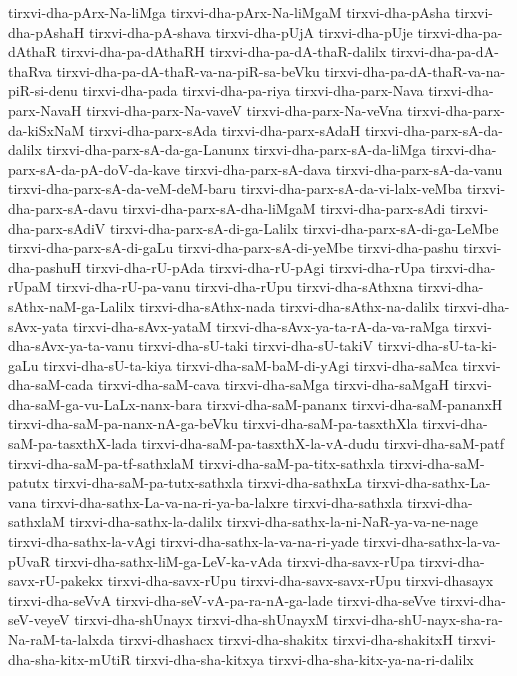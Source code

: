 {tirxvi-dha-pArx-Na-liMga
tirxvi-dha-pArx-Na-liMgaM
tirxvi-dha-pAsha
tirxvi-dha-pAshaH
tirxvi-dha-pA-shava
tirxvi-dha-pUjA
tirxvi-dha-pUje
tirxvi-dha-pa-dAthaR
tirxvi-dha-pa-dAthaRH
tirxvi-dha-pa-dA-thaR-dalilx
tirxvi-dha-pa-dA-thaRva
tirxvi-dha-pa-dA-thaR-va-na-piR-sa-beVku
tirxvi-dha-pa-dA-thaR-va-na-piR-si-denu
tirxvi-dha-pada
tirxvi-dha-pa-riya
tirxvi-dha-parx-Nava
tirxvi-dha-parx-NavaH
tirxvi-dha-parx-Na-vaveV
tirxvi-dha-parx-Na-veVna
tirxvi-dha-parx-da-kiSxNaM
tirxvi-dha-parx-sAda
tirxvi-dha-parx-sAdaH
tirxvi-dha-parx-sA-da-dalilx
tirxvi-dha-parx-sA-da-ga-Lanunx
tirxvi-dha-parx-sA-da-liMga
tirxvi-dha-parx-sA-da-pA-doV-da-kave
tirxvi-dha-parx-sA-dava
tirxvi-dha-parx-sA-da-vanu
tirxvi-dha-parx-sA-da-veM-deM-baru
tirxvi-dha-parx-sA-da-vi-lalx-veMba
tirxvi-dha-parx-sA-davu
tirxvi-dha-parx-sA-dha-liMgaM
tirxvi-dha-parx-sAdi
tirxvi-dha-parx-sAdiV
tirxvi-dha-parx-sA-di-ga-Lalilx
tirxvi-dha-parx-sA-di-ga-LeMbe
tirxvi-dha-parx-sA-di-gaLu
tirxvi-dha-parx-sA-di-yeMbe
tirxvi-dha-pashu
tirxvi-dha-pashuH
tirxvi-dha-rU-pAda
tirxvi-dha-rU-pAgi
tirxvi-dha-rUpa
tirxvi-dha-rUpaM
tirxvi-dha-rU-pa-vanu
tirxvi-dha-rUpu
tirxvi-dha-sAthxna
tirxvi-dha-sAthx-naM-ga-Lalilx
tirxvi-dha-sAthx-nada
tirxvi-dha-sAthx-na-dalilx
tirxvi-dha-sAvx-yata
tirxvi-dha-sAvx-yataM
tirxvi-dha-sAvx-ya-ta-rA-da-va-raMga
tirxvi-dha-sAvx-ya-ta-vanu
tirxvi-dha-sU-taki
tirxvi-dha-sU-takiV
tirxvi-dha-sU-ta-ki-gaLu
tirxvi-dha-sU-ta-kiya
tirxvi-dha-saM-baM-di-yAgi
tirxvi-dha-saMca
tirxvi-dha-saM-cada
tirxvi-dha-saM-cava
tirxvi-dha-saMga
tirxvi-dha-saMgaH
tirxvi-dha-saM-ga-vu-LaLx-nanx-bara
tirxvi-dha-saM-pananx
tirxvi-dha-saM-pananxH
tirxvi-dha-saM-pa-nanx-nA-ga-beVku
tirxvi-dha-saM-pa-tasxthXla
tirxvi-dha-saM-pa-tasxthX-lada
tirxvi-dha-saM-pa-tasxthX-la-vA-dudu
tirxvi-dha-saM-patf
tirxvi-dha-saM-pa-tf-sathxlaM
tirxvi-dha-saM-pa-titx-sathxla
tirxvi-dha-saM-patutx
tirxvi-dha-saM-pa-tutx-sathxla
tirxvi-dha-sathxLa
tirxvi-dha-sathx-La-vana
tirxvi-dha-sathx-La-va-na-ri-ya-ba-lalxre
tirxvi-dha-sathxla
tirxvi-dha-sathxlaM
tirxvi-dha-sathx-la-dalilx
tirxvi-dha-sathx-la-ni-NaR-ya-va-ne-nage
tirxvi-dha-sathx-la-vAgi
tirxvi-dha-sathx-la-va-na-ri-yade
tirxvi-dha-sathx-la-va-pUvaR
tirxvi-dha-sathx-liM-ga-LeV-ka-vAda
tirxvi-dha-savx-rUpa
tirxvi-dha-savx-rU-pakekx
tirxvi-dha-savx-rUpu
tirxvi-dha-savx-savx-rUpu
tirxvi-dhasayx
tirxvi-dha-seVvA
tirxvi-dha-seV-vA-pa-ra-nA-ga-lade
tirxvi-dha-seVve
tirxvi-dha-seV-veyeV
tirxvi-dha-shUnayx
tirxvi-dha-shUnayxM
tirxvi-dha-shU-nayx-sha-ra-Na-raM-ta-lalxda
tirxvi-dhashacx
tirxvi-dha-shakitx
tirxvi-dha-shakitxH
tirxvi-dha-sha-kitx-mUtiR
tirxvi-dha-sha-kitxya
tirxvi-dha-sha-kitx-ya-na-ri-dalilx
}
